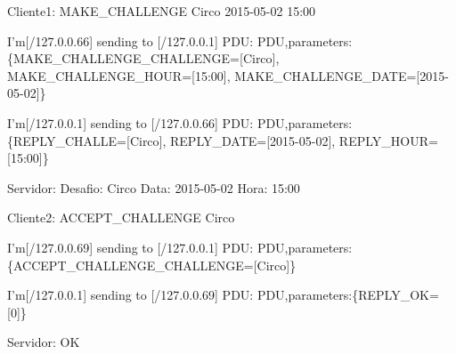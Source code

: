 \documentclass[runningheads,a4paper]{llncs}
\begin{document}
Cliente1: MAKE\_CHALLENGE Circo 2015-05-02 15:00

I'm[/127.0.0.66] sending to [/127.0.0.1] PDU: PDU,parameters:\{MAKE\_CHALLENGE\_CHALLENGE=[Circo], MAKE\_CHALLENGE\_HOUR=[15:00], MAKE\_CHALLENGE\_DATE=[2015-05-02]\}

I'm[/127.0.0.1] sending to [/127.0.0.66] PDU: PDU,parameters:\{REPLY\_CHALLE=[Circo], REPLY\_DATE=[2015-05-02], REPLY\_HOUR=[15:00]\}

Servidor:  Desafio: Circo Data: 2015-05-02 Hora: 15:00

Cliente2: ACCEPT\_CHALLENGE Circo

I'm[/127.0.0.69] sending to [/127.0.0.1] PDU: PDU,parameters:\{ACCEPT\_CHALLENGE\_CHALLENGE=[Circo]\}

I'm[/127.0.0.1] sending to [/127.0.0.69] PDU: PDU,parameters:\{REPLY\_OK=[0]\}

Servidor: OK
\end{document}
